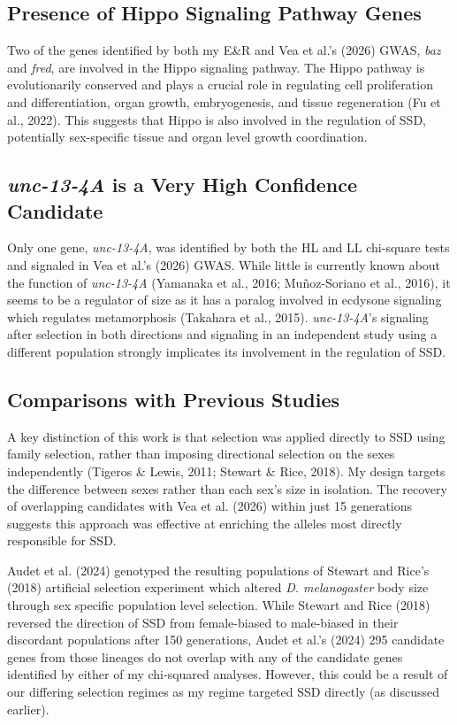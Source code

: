 \documentclass[12pt,reqno,oneside]{report}
\begin{document}
\subsection{Presence of Hippo Signaling Pathway Genes}

Two of the genes identified by both my E\&R and Vea et al.'s (2026) GWAS, \textit{baz} and \textit{fred}, are involved in the Hippo signaling pathway. The Hippo pathway is evolutionarily conserved and plays a crucial role in regulating cell proliferation and differentiation, organ growth, embryogenesis, and tissue regeneration (Fu et al., 2022). This suggests that Hippo is also involved in the regulation of SSD, potentially sex-specific tissue and organ level growth coordination.

\subsection{\textit{unc-13-4A} is a Very High Confidence Candidate}

Only one gene, \textit{unc-13-4A}, was identified by both the HL and LL chi-square tests and signaled in Vea et al.'s (2026) GWAS. While little is currently known about the function of \textit{unc-13-4A} (Yamanaka et al., 2016; Muñoz-Soriano et al., 2016), it seems to be a regulator of size as it has a paralog involved in ecdysone signaling which regulates metamorphosis (Takahara et al., 2015). \textit{unc-13-4A}'s signaling after selection in both directions and signaling in an independent study using a different population strongly implicates its involvement in the regulation of SSD. 

\subsection{Comparisons with Previous Studies}

A key distinction of this work is that selection was applied directly to SSD using family selection, rather than imposing directional selection on the sexes independently (Tigeros \& Lewis, 2011; Stewart \& Rice, 2018). My design targets the difference between sexes rather than each sex's size in isolation. The recovery of overlapping candidates with Vea et al. (2026) within just 15 generations suggests this approach was effective at enriching the alleles most directly responsible for SSD.

Audet et al. (2024) genotyped the resulting populations of Stewart and Rice's (2018) artificial selection experiment which altered \textit{D. melanogaster} body size through sex specific population level selection. While Stewart and Rice (2018) reversed the direction of SSD from female-biased to male-biased in their discordant populations after 150 generations, Audet et al.'s (2024) 295 candidate genes from those lineages do not overlap with any of the candidate genes identified by either of my chi-squared analyses. However, this could be a result of our differing selection regimes as my regime targeted SSD directly (as discussed earlier).
\end{document}
